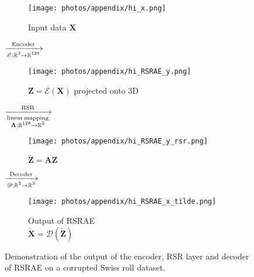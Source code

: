 \documentclass{article} \usepackage{iclr2020_conference,times}
\def\rmA{{\mathbf{A}}}
\def\rmX{{\mathbf{X}}}
\def\rmZ{{\mathbf{Z}}}
\newcommand{\R}{\mathbb{R}}
\begin{document}
\begin{figure}[ht]
\centering
\begin{subfigure}{0.3\textwidth}
\centering
    \texttt{[image: photos/appendix/hi\_x.png]}
    \caption{Input data $\rmX$}
\label{fig:RSRAE_x}
\end{subfigure}{\large$\xrightarrow[\begin{subarray}{c} \mathscr{E}:\R^3 \rightarrow \R^{128}  \end{subarray}]{ \rm{Encoder}  } $}\begin{subfigure}{0.3\textwidth}
\centering
    \texttt{[image: photos/appendix/hi\_RSRAE\_y.png]}
    \caption{$\rmZ=\mathscr{E}(\rmX)$ projected onto 3D}
\label{fig:RSRAE_y}
\end{subfigure}
{\large$\xrightarrow[ \begin{subarray}{c} \rm{linear \,mapping} \\ \rmA:\R^{128} \rightarrow \R^{2} \end{subarray}   ]{\rm{~RSR~}}$}\begin{subfigure}{0.3\textwidth}
\centering
    \texttt{[image: photos/appendix/hi\_RSRAE\_y\_rsr.png]}
    \caption{$\tilde{\rmZ} = \rmA \rmZ$ }
\label{fig:RSRAE_yrsr}
\end{subfigure}
{\large$\xrightarrow[\begin{subarray}{c} \mathscr{D}:\R^2 \rightarrow \R^{3}  \end{subarray}]{ \rm{Decoder}  } $}\begin{subfigure}{0.3\textwidth}
\centering
    \texttt{[image: photos/appendix/hi\_RSRAE\_x\_tilde.png]}
    \caption{Output of RSRAE \\ $\tilde{\rmX}=\mathscr{D}(\tilde{\rmZ})$}
\label{fig:RSRAE_xtilde}
\end{subfigure}


\caption{{Demonstration of the output of the encoder, RSR layer and decoder of RSRAE on a corrupted Swiss roll dataset.}}
\label{fig:RSRAE_structure}

\end{figure}
\end{document}
